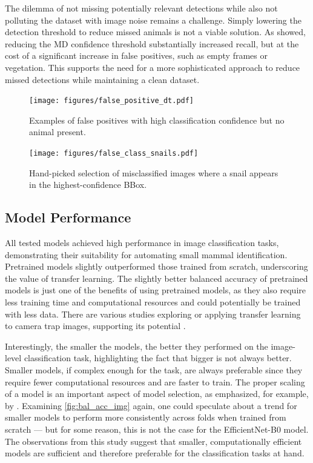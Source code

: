 The dilemma of not missing potentially relevant detections while also not polluting the dataset with image noise remains a challenge.
Simply lowering the detection threshold to reduce missed animals is not a viable solution.
As \textcite{leornaHumanVsMachine2022} showed, reducing the \ac{MD} confidence threshold substantially increased recall, but at the cost of a significant increase in false positives, such as empty frames or vegetation.
This supports the need for a more sophisticated approach to reduce missed detections while maintaining a clean dataset.

\begin{figure}[ht]
\centering
\texttt{[image: figures/false\_positive\_dt.pdf]}
\caption{Examples of false positives with high classification confidence but no animal present.}
\label{fig:false_positive_dt}
\end{figure}

\begin{figure}[ht]
\centering
\texttt{[image: figures/false\_class\_snails.pdf]}
\caption{Hand-picked selection of misclassified images where a snail appears in the highest-confidence BBox.}
\label{fig:false_class_snails}
\end{figure}

\subsection{Model Performance}
All tested models achieved high performance in image classification tasks, demonstrating their suitability for automating small mammal identification.
Pretrained models slightly outperformed those trained from scratch, underscoring the value of transfer learning.
The slightly better balanced accuracy of pretrained models is just one of the benefits of using pretrained models, as they also require less training time and computational resources and could potentially be trained with less data.
There are various studies exploring or applying transfer learning to camera trap images, supporting its potential \autocite{stancicClassificationEfficiencyPreTrained2022,hopkinsDetectingMonitoringRodents2024,doanWildlifeSpeciesClassification2024,rameshExploringGeneralizabilityTransfer2025}.

Interestingly, the smaller the models, the better they performed on the image-level classification task, highlighting the fact that bigger is not always better.
Smaller models, if complex enough for the task, are always preferable since they require fewer computational resources and are faster to train.
The proper scaling of a model is an important aspect of model selection, as emphasized, for example, by \textcite{tanEfficientNetRethinkingModel2019}.
Examining \autoref{fig:bal_acc_img} again, one could speculate about a trend for smaller models to perform more consistently across folds when trained from scratch --- but for some reason, this is not the case for the EfficientNet-B0 model.
The observations from this study suggest that smaller, computationally efficient models are sufficient and therefore preferable for the classification tasks at hand.


